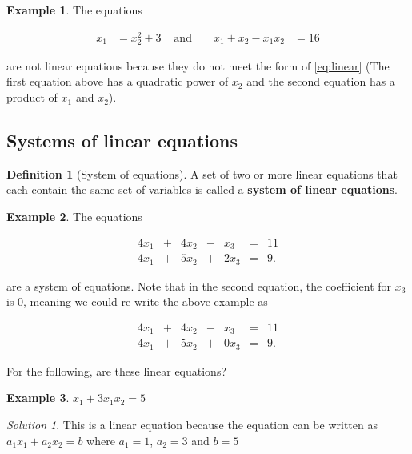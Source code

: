 \documentclass[
]{book}
\theoremstyle{definition}
\newtheorem{definition}{Definition}[chapter]
\theoremstyle{definition}
\newtheorem{example}{Example}[chapter]
\theoremstyle{definition}
\theoremstyle{definition}
\theoremstyle{remark}
\newtheorem*{solution}{Solution}
\begin{document}
\begin{example}
The equations

\[
\begin{aligned}
x_1 & = x_2^2 + 3
& \mbox{ and } && 
x_1 + x_2 - x_1 x_2 & = 16
\end{aligned}
\]

are not linear equations because they do not meet the form of \eqref{eq:linear} (The first equation above has a quadratic power of \(x_2\) and the second equation has a product of \(x_1\) and \(x_2\)).
\end{example}

\hypertarget{systems-of-linear-equations}{%
\subsection{Systems of linear equations}\label{systems-of-linear-equations}}

\begin{definition}[System of equations]
A set of two or more linear equations that each contain the same set of variables is called a \textbf{system of linear equations}.
\end{definition}

\begin{example}
The equations

\begin{alignat*}{4}
x_1   & {}+{} & 4 x_2 & {}-{} & x_3 & {}={} & 11 \\
4 x_1 & {}+{} & 5 x_2 & {}+{} & 2 x_3 & {}={} & 9.
\end{alignat*}

are a system of equations. Note that in the second equation, the coefficient for \(x_3\) is 0, meaning we could re-write the above example as

\begin{alignat*}{4}
x_1   & {}+{} & 4 x_2 & {}-{} & x_3 & {}={} & 11 \\
4 x_1 & {}+{} & 5 x_2 & {}+{} & 0 x_3 & {}={} & 9.
\end{alignat*}
\end{example}

For the following, are these linear equations?

\begin{example}
\(x_1 + 3 x_1 x_2 = 5\)
\end{example}

\begin{solution}
This is a linear equation because the equation can be written as \(a_1 x_1 + a_2 x_2 = b\) where \(a_1 = 1\), \(a_2 = 3\) and \(b = 5\)
\end{solution}
\end{document}
